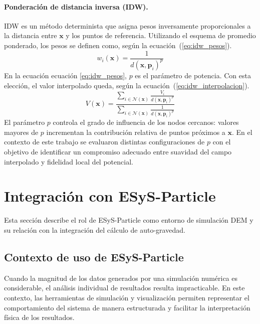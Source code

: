 \documentclass[a4paper,11pt]{book}
\newcommand{\red}[1]{\textcolor{red}{#1}}
\begin{document}
\paragraph{Ponderación de distancia inversa (IDW).}
IDW es un método determinista que asigna pesos inversamente proporcionales a la distancia entre $\mathbf{x}$ y los puntos de referencia. Utilizando el esquema de promedio ponderado, los pesos se definen como, según la ecuación~(\ref{eq:idw_pesos}).
\begin{equation}
	w_i(\mathbf{x}) = \frac{1}{d(\mathbf{x},\mathbf{p}_i)^p}
	\label{eq:idw_pesos}
\end{equation}
En la ecuación ecuación \ref{eq:idw_pesos}, $p$ es el parámetro de potencia. Con esta elección, el valor interpolado queda, según la ecuación~(\ref{eq:idw_interpolacion}).
\begin{equation}
	V(\mathbf{x}) = \frac{\sum_{i\in\mathcal{N}(\mathbf{x})} \frac{V_i}{d(\mathbf{x},\mathbf{p}_i)^p}}
	{\sum_{i\in\mathcal{N}(\mathbf{x})} \frac{1}{d(\mathbf{x},\mathbf{p}_i)^p}}
	\label{eq:idw_interpolacion}
\end{equation}
El parámetro $p$ controla el grado de influencia de los nodos cercanos: valores mayores de $p$ incrementan la contribución relativa de puntos próximos a $\mathbf{x}$. En el contexto de este trabajo se evaluaron distintas configuraciones de $p$ con el objetivo de identificar un compromiso adecuado entre suavidad del campo interpolado y fidelidad local del potencial.

\section{Integración con ESyS-Particle}
\label{sec:esys_particle}

Esta sección describe el rol de ESyS-Particle como entorno de simulación DEM y su relación con la integración del cálculo de auto-gravedad.


\subsection{Contexto de uso de ESyS-Particle}

Cuando la magnitud de los datos generados por una simulación numérica es considerable, el análisis individual de resultados resulta impracticable. En este contexto, las herramientas de simulación y visualización permiten representar el comportamiento del sistema de manera estructurada y facilitar la interpretación física de los resultados.
\end{document}
